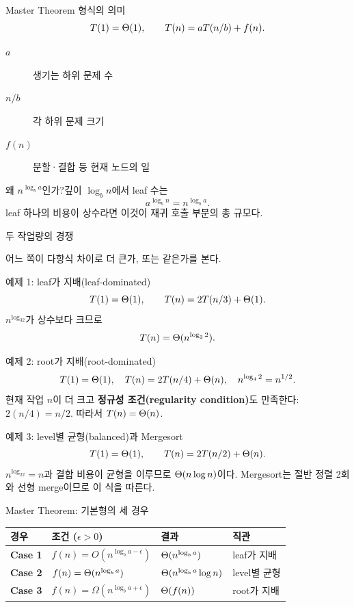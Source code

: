 \begin{frame}{Master Theorem 형식의 의미}
\[
T(1)=\Theta(1),\qquad T(n)=aT(n/b)+f(n).
\]
\begin{description}\item[$a$]생기는 하위 문제 수\item[$n/b$]각 하위 문제 크기\item[$f(n)$]분할·결합 등 현재 노드의 일\end{description}
\vfill{}
\end{frame}
\begin{frame}{왜 $n^{\log_ba}$인가?}깊이 $\log_bn$에서 leaf 수는\[a^{\log_bn}=n^{\log_ba}.\]leaf 하나의 비용이 상수라면 이것이 재귀 호출 부분의 총 규모다.
\end{frame}
\begin{frame}{두 작업량의 경쟁}\centering{}\vfill 어느 쪽이 다항식 차이로 더 큰가, 또는 같은가를 본다.
\end{frame}
\begin{frame}{예제 1: leaf가 지배(leaf-dominated)}
\optional[추가 예제]\hfill
\[T(1)=\Theta(1),\qquad T(n)=2T(n/3)+\Theta(1).\]
$n^{\log_32}$가 상수보다 크므로
\[T(n)=\Theta(n^{\log_32}).\]
\end{frame}
\begin{frame}{예제 2: root가 지배(root-dominated)}
\optional[추가 예제]\hfill
\[T(1)=\Theta(1),\quad T(n)=2T(n/4)+\Theta(n),\quad n^{\log_42}=n^{1/2}.\]
현재 작업 $n$이 더 크고 \textbf{정규성 조건(regularity condition)}도 만족한다:
$2(n/4)=n/2$. 따라서 $T(n)=\Theta(n)$.
\end{frame}
\begin{frame}{예제 3: level별 균형(balanced)과 Mergesort}
\[T(1)=\Theta(1),\qquad T(n)=2T(n/2)+\Theta(n).\]
$n^{\log_22}=n$과 결합 비용이 균형을 이루므로 $\Theta(n\log n)$이다.
Mergesort는 절반 정렬 2회와 선형 merge이므로 이 식을 따른다.
\end{frame}
\begin{frame}{Master Theorem: 기본형의 세 경우}\small
\renewcommand{\arraystretch}{1.45}
\begin{tabular}{@{}>{\bfseries}p{}p{}p{}p{}@{}}
\toprule 경우&조건 ($\epsilon>0$)&결과&직관\\\midrule
Case 1&$f(n)=O(n^{\log_ba-\epsilon})$&$\Theta(n^{\log_ba})$&leaf가 지배\\
Case 2&$f(n)=\Theta(n^{\log_ba})$&$\Theta(n^{\log_ba}\log n)$&level별 균형\\
Case 3&$f(n)=\Omega(n^{\log_ba+\epsilon})$&$\Theta(f(n))$&root가 지배\\\bottomrule
\end{tabular}
\vfill{}
\par\smallskip
{}
\end{frame}
